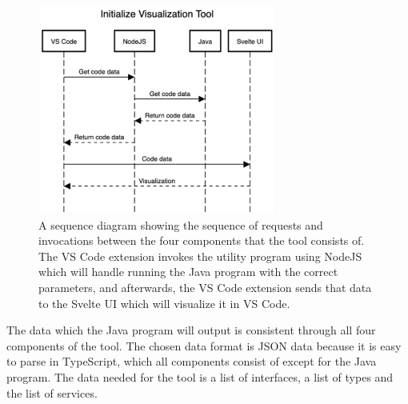 \begin{figure}[h!]
    \center
    \includegraphics[width=0.70\textwidth]{figures/init_tool_sequence.png}
    \caption{A sequence diagram showing the sequence of requests and invocations between the four components that the tool consists of. The VS Code extension invokes the utility program using NodeJS which will handle running the Java program with the correct parameters, and afterwards, the VS Code extension sends that data to the Svelte UI which will visualize it in VS Code.}
    \label{figure:init_tool_sequence}
\end{figure}

The data which the Java program will output is consistent through all
four components of the tool. The chosen data format is JSON data because it is easy to parse in TypeScript, which all components consist of except for the Java program.
The data needed for the tool is a list of interfaces, a list of types and the list of services.

